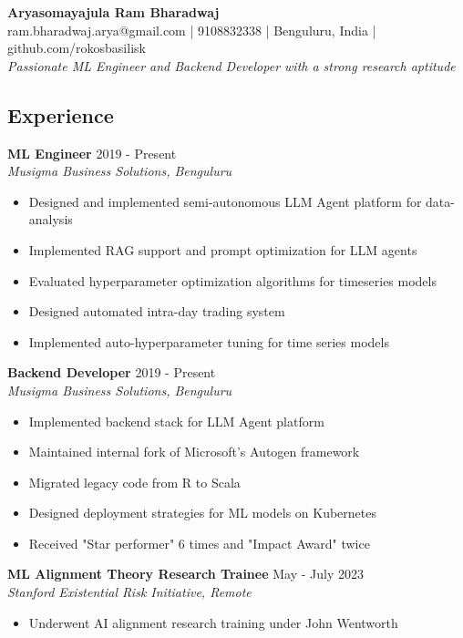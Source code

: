 \documentclass[10pt,letterpaper]{article}
\newcommand{\entry}[4]{
    \textbf{#1} \hfill #2 \\
    \textit{#3} \\
    #4
    \vspace{0.3em}
}
\begin{document}
\begin{center}
    \huge\textbf{Aryasomayajula Ram Bharadwaj} \\
    \small ram.bharadwaj.arya@gmail.com | 9108832338 | Benguluru, India | github.com/rokosbasilisk \\
    \textit{Passionate ML Engineer and Backend Developer with a strong research aptitude}
\end{center}

\vspace{-0.5em}

\begin{multicols}{2}

\section{Experience}
\entry{ML Engineer}{2019 - Present}{Musigma Business Solutions, Benguluru}{
    \begin{itemize}
        \item Designed and implemented semi-autonomous LLM Agent platform for data-analysis
        \item Implemented RAG support and prompt optimization for LLM agents
        \item Evaluated hyperparameter optimization algorithms for timeseries models
        \item Designed automated intra-day trading system
        \item Implemented auto-hyperparameter tuning for time series models
    \end{itemize}
}

\entry{Backend Developer}{2019 - Present}{Musigma Business Solutions, Benguluru}{
    \begin{itemize}
        \item Implemented backend stack for LLM Agent platform
        \item Maintained internal fork of Microsoft's Autogen framework
        \item Migrated legacy code from R to Scala
        \item Designed deployment strategies for ML models on Kubernetes
        \item Received "Star performer" 6 times and "Impact Award" twice
    \end{itemize}
}

\entry{ML Alignment Theory Research Trainee}{May - July 2023}{Stanford Existential Risk Initiative, Remote}{
    \begin{itemize}
        \item Underwent AI alignment research training under John Wentworth
    \end{itemize}
}


\end{multicols}
\end{document}
